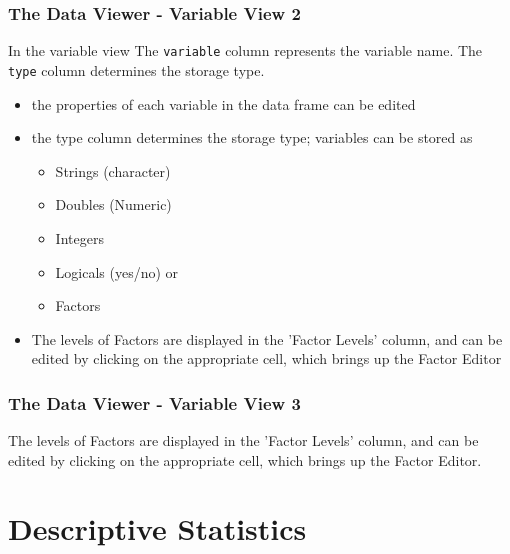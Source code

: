 \documentclass[xcolor={table},c]{beamer}
\begin{document}
\begin{frame}\frametitle{The Data Viewer - Variable View 2}
  In the variable view  The \texttt{variable} column represents the variable name. The \texttt{type} column determines the storage type.  
  \begin{itemize}
  \item the properties of each variable in the data frame can be edited
  \item the type column determines the storage type; variables can be stored as 
    \begin{itemize}
    \item Strings (character)
    \item Doubles (Numeric)
    \item Integers
    \item Logicals (yes/no) or 
    \item Factors
    \end{itemize}
  \item The levels of Factors are displayed in the 'Factor Levels' column, and can be edited by clicking on the appropriate cell, which brings up the Factor Editor
  \end{itemize}
\end{frame}

\begin{frame}\frametitle{The Data Viewer - Variable View 3}
The levels of Factors are displayed in the 'Factor Levels' column, and can be edited by clicking on the appropriate cell, which brings up the Factor Editor. 
\begin{center}
\end{center}
\end{frame}

\section{Descriptive Statistics}
\end{document}

